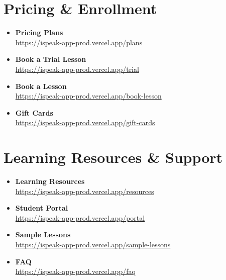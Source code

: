 \documentclass[11pt,a4paper]{article}
\begin{document}
\section{Pricing \& Enrollment}

\begin{itemize}[itemsep=0.5em]
    \item \textbf{Pricing Plans}\\
    \href{https://ispeak-app-prod.vercel.app/plans}{https://ispeak-app-prod.vercel.app/plans}
    
    \item \textbf{Book a Trial Lesson}\\
    \href{https://ispeak-app-prod.vercel.app/trial}{https://ispeak-app-prod.vercel.app/trial}
    
    \item \textbf{Book a Lesson}\\
    \href{https://ispeak-app-prod.vercel.app/book-lesson}{https://ispeak-app-prod.vercel.app/book-lesson}
    
    \item \textbf{Gift Cards}\\
    \href{https://ispeak-app-prod.vercel.app/gift-cards}{https://ispeak-app-prod.vercel.app/gift-cards}
\end{itemize}

\section{Learning Resources \& Support}

\begin{itemize}[itemsep=0.5em]
    \item \textbf{Learning Resources}\\
    \href{https://ispeak-app-prod.vercel.app/resources}{https://ispeak-app-prod.vercel.app/resources}
    
    \item \textbf{Student Portal}\\
    \href{https://ispeak-app-prod.vercel.app/portal}{https://ispeak-app-prod.vercel.app/portal}
    
    \item \textbf{Sample Lessons}\\
    \href{https://ispeak-app-prod.vercel.app/sample-lessons}{https://ispeak-app-prod.vercel.app/sample-lessons}
    
    \item \textbf{FAQ}\\
    \href{https://ispeak-app-prod.vercel.app/faq}{https://ispeak-app-prod.vercel.app/faq}
\end{itemize}
\end{document}
